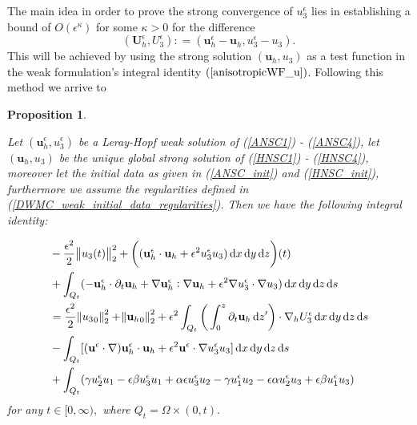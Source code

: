 \documentclass[11pt, a4paper]{article}
\newtheorem{prop}{Proposition}
\newcommand*\diff{\mathop{}\!\mathrm{d}}
\begin{document}
The main idea in order to prove the strong convergence of $u^\epsilon_3$ lies in establishing a bound of $O(\epsilon^\kappa)$ for some $\kappa>0$ for the difference \begin{equation}\label{velocitydifferencefunctions}(\mathbf{U}_h^\epsilon, U_3^\epsilon): = (\mathbf{u}_h^\epsilon - \mathbf{u}_h, u_3^\epsilon - u_3).\end{equation} This will be achieved by using the strong solution $(\mathbf{u}_h,u_3)$ as a test function in the weak formulation's integral identity $(\ref{anisotropicWF_u})$. Following this method we arrive to

\begin{prop} \label{propIdentity}

Let $(\mathbf{u}_h^\epsilon, u_3^\epsilon)$ be a Leray-Hopf weak solution of (\ref{ANSC1}) - (\ref{ANSC4}), let $(\mathbf{u}_h,u_3)$ be the unique global strong solution of (\ref{HNSC1}) - (\ref{HNSC4}), moreover let the initial data as given in (\ref{ANSC_init}) and (\ref{HNSC_init}), furthermore we assume the regularities defined in (\ref{DWMC_weak_initial_data_regularities}). Then we have the following integral identity:

\begin{equation} \label{integralIdentity_prop}
\begin{split}
& - \frac{\epsilon^2}{2} \norm{u_3(t)}_2^2 + \bigg ( (\mathbf{u}_h^\epsilon \cdot \mathbf{u}_h + \epsilon^2 u_3^\epsilon u_3) \diff x \diff y \diff z \bigg ) (t) \\
& + \int_{Q_t} (-\mathbf{u}_h^\epsilon \cdot \partial_t \mathbf{u}_h + \nabla \mathbf{u}_h^\epsilon : \nabla \mathbf{u}_h + \epsilon^2 \nabla u_3^\epsilon \cdot \nabla u_3) \diff x \diff y \diff z \diff s \\
& = \frac{\epsilon^2}{2} \norm{{u_3}_0}_2^2 + \norm{{\mathbf{u}_h}_0}_2^2 + \epsilon^2 \int_{Q_t} \bigg ( \int_0^z \partial_t \mathbf{u}_h \diff z' \bigg ) \cdot \nabla_h U_3^\epsilon \diff x \diff y \diff z \diff s \\
& - \int_{Q_t} [(\mathbf{u}^\epsilon \cdot \nabla) \mathbf{u}_h^\epsilon \cdot \mathbf{u}_h + \epsilon^2 \mathbf{u}^\epsilon \cdot \nabla u_3^\epsilon u_3] \diff x \diff y \diff z \diff s \\
& + \int_{Q_t} ( \gamma u_2^\epsilon u_1 - \epsilon \beta u_3^\epsilon u_1 + \alpha \epsilon u_3^\epsilon u_2 - \gamma u_1^\epsilon u_2 - \epsilon \alpha u^\epsilon_2 u_3 + \epsilon \beta u_1^\epsilon u_3)
\end{split}
\end{equation}
%
for any $t \in [0, \infty),$ where $Q_t = \Omega \times (0,t).$

\end{prop}
\end{document}
